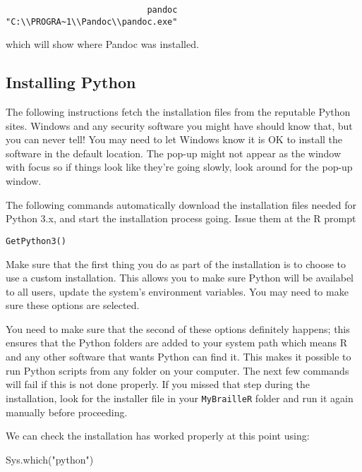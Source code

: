 \documentclass[
]{book}
\newenvironment{Shaded}{\begin{snugshade}}{\end{snugshade}}
\newcommand{\FunctionTok}[1]{\textcolor[rgb]{0.00,0.00,0.00}{#1}}
\newcommand{\NormalTok}[1]{#1}
\newcommand{\StringTok}[1]{\textcolor[rgb]{0.31,0.60,0.02}{#1}}
\begin{document}
\begin{verbatim}
                            pandoc 
"C:\\PROGRA~1\\Pandoc\\pandoc.exe" 
\end{verbatim}

which will show where Pandoc was installed.

\hypertarget{installing-python}{%
\subsection{Installing Python}\label{installing-python}}

The following instructions fetch the installation files from the reputable Python sites. Windows and any security software you might have should know that, but you can never tell! You may need to let Windows know it is OK to install the software in the default location. The pop-up might not appear as the window with focus so if things look like they're going slowly, look around for the pop-up window.

The following commands automatically download the installation files needed for Python 3.x, and start the installation process going.
Issue them at the R prompt

\texttt{GetPython3()}

Make sure that the first thing you do as part of the installation is to choose to use a custom installation. This allows you to make sure Python will be availabel to all users, update the system's environment variables. You may need to make sure these options are selected.

You need to make sure that the second of these options definitely happens; this ensures that the Python folders are added to your system path which means R and any other software that wants Python can find it. This makes it possible to run Python scripts from any folder on your computer. The next few commands will fail if this is not done properly. If you missed that step during the installation, look for the installer file in your \texttt{MyBrailleR} folder and run it again manually before proceeding.

We can check the installation has worked properly at this point using:

\begin{Shaded}
\begin{Highlighting}[]
\FunctionTok{Sys.which}\NormalTok{(}\StringTok{"python"}\NormalTok{)}
\end{Highlighting}
\end{Shaded}
\end{document}
